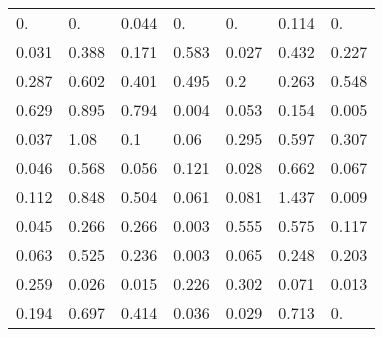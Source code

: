 \begin{tabular}{|lllllll|}
\color[HTML]{909090}0. & \color[HTML]{909090}0. & \color[HTML]{808080}0.044 & \color[HTML]{909090}0. & \color[HTML]{909090}0. & \color[HTML]{707070}0.114 & \color[HTML]{909090}0. \\ 
\color[HTML]{808080}0.031 & \color[HTML]{101010}0.388 & \color[HTML]{606060}0.171 & \color[HTML]{000000}0.583 & \color[HTML]{808080}0.027 & \color[HTML]{000000}0.432 & \color[HTML]{404040}0.227 \\ 
\color[HTML]{303030}0.287 & \color[HTML]{000000}0.602 & \color[HTML]{101010}0.401 & \color[HTML]{000000}0.495 & \color[HTML]{505050}0.2 & \color[HTML]{404040}0.263 & \color[HTML]{000000}0.548 \\ 
\color[HTML]{000000}0.629 & \color[HTML]{000000}0.895 & \color[HTML]{000000}0.794 & \color[HTML]{909090}0.004 & \color[HTML]{808080}0.053 & \color[HTML]{606060}0.154 & \color[HTML]{909090}0.005 \\ 
\color[HTML]{808080}0.037 & \color[HTML]{000000}1.08 & \color[HTML]{707070}0.1 & \color[HTML]{808080}0.06 & \color[HTML]{303030}0.295 & \color[HTML]{000000}0.597 & \color[HTML]{303030}0.307 \\ 
\color[HTML]{808080}0.046 & \color[HTML]{000000}0.568 & \color[HTML]{808080}0.056 & \color[HTML]{707070}0.121 & \color[HTML]{808080}0.028 & \color[HTML]{000000}0.662 & \color[HTML]{808080}0.067 \\ 
\color[HTML]{707070}0.112 & \color[HTML]{000000}0.848 & \color[HTML]{000000}0.504 & \color[HTML]{808080}0.061 & \color[HTML]{707070}0.081 & \color[HTML]{000000}1.437 & \color[HTML]{909090}0.009 \\ 
\color[HTML]{808080}0.045 & \color[HTML]{404040}0.266 & \color[HTML]{404040}0.266 & \color[HTML]{909090}0.003 & \color[HTML]{000000}0.555 & \color[HTML]{000000}0.575 & \color[HTML]{707070}0.117 \\ 
\color[HTML]{808080}0.063 & \color[HTML]{000000}0.525 & \color[HTML]{404040}0.236 & \color[HTML]{909090}0.003 & \color[HTML]{808080}0.065 & \color[HTML]{404040}0.248 & \color[HTML]{505050}0.203 \\ 
\color[HTML]{404040}0.259 & \color[HTML]{808080}0.026 & \color[HTML]{909090}0.015 & \color[HTML]{404040}0.226 & \color[HTML]{303030}0.302 & \color[HTML]{808080}0.071 & \color[HTML]{909090}0.013 \\ 
\color[HTML]{505050}0.194 & \color[HTML]{000000}0.697 & \color[HTML]{101010}0.414 & \color[HTML]{808080}0.036 & \color[HTML]{808080}0.029 & \color[HTML]{000000}0.713 & \color[HTML]{909090}0.
\end{tabular}
